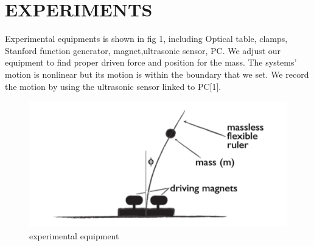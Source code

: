 \documentclass{article}
\begin{document}
\section{\textbf{EXPERIMENTS}}

Experimental equipments is shown in fig 1, including Optical table, clamps, Stanford function generator, magnet,ultrasonic sensor, PC. We adjust our equipment to find proper driven force and position for the mass. The systems' motion is nonlinear but its motion is within the boundary that we set. We record the motion by using the ultrasonic sensor linked to PC[1].
\begin{figure}[h]
	\centering
	\includegraphics[width=0.7\linewidth]{plot/exp}
	\caption{experimental equipment}
	\label{fig:exp}
\end{figure}
\end{document}
